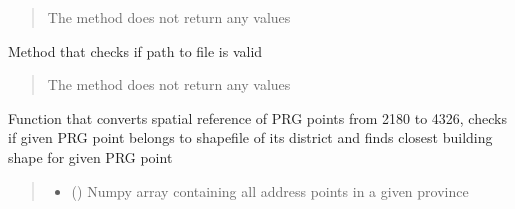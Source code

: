 \documentclass[letterpaper,10pt,english]{sphinxmanual}
\begin{document}
\begin{fulllineitems}
\begin{fulllineitems}
\begin{quote}
\begin{description}
\begin{itemize}
\end{itemize}

\sphinxAtStartPar
The method does not return any values

\end{description}\end{quote}

\end{fulllineitems}


\begin{fulllineitems}
\label{\detokenize{xml_parsers:xml_parsers.PRGDataParser.check_path}}
\pysigstartsignatures
{}
\pysigstopsignatures
\sphinxAtStartPar
Method that checks if path to file is valid
\begin{quote}\begin{description}
\sphinxAtStartPar
{}

\sphinxAtStartPar
The method does not return any values

\end{description}\end{quote}

\end{fulllineitems}


\begin{fulllineitems}
\label{\detokenize{xml_parsers:xml_parsers.PRGDataParser.check_prg_pts_add_db}}
\pysigstartsignatures
{}
\pysigstopsignatures
\sphinxAtStartPar
Function that converts spatial reference of PRG points from 2180 to 4326, checks if given PRG point belongs
to shapefile of its district and finds closest building shape for given PRG point
\begin{quote}\begin{description}
\begin{itemize}
\item {} 
\sphinxAtStartPar
{} () \textendash{} Numpy array containing all address points in a given province


\end{itemize}
\end{description}
\end{quote}
\end{fulllineitems}
\end{fulllineitems}
\end{document}
